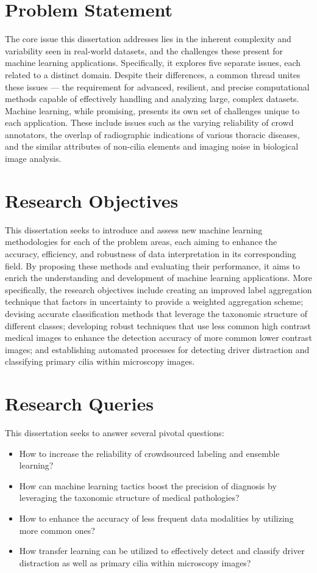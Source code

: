 \section{Problem Statement}
The core issue this dissertation addresses lies in the inherent complexity and variability seen in real-world datasets, and the challenges these present for machine learning applications. Specifically, it explores five separate issues, each related to a distinct domain. Despite their differences, a common thread unites these issues --- the requirement for advanced, resilient, and precise computational methods capable of effectively handling and analyzing large, complex datasets. Machine learning, while promising, presents its own set of challenges unique to each application. These include issues such as the varying reliability of crowd annotators, the overlap of radiographic indications of various thoracic diseases, and the similar attributes of non-cilia elements and imaging noise in biological image analysis.

\section{Research Objectives}
This dissertation seeks to introduce and assess new machine learning methodologies for each of the problem areas, each aiming to enhance the accuracy, efficiency, and robustness of data interpretation in its corresponding field. By proposing these methods and evaluating their performance, it aims to enrich the understanding and development of machine learning applications. More specifically, the research objectives include creating an improved label aggregation technique that factors in uncertainty to provide a weighted aggregation scheme; devising accurate classification methods that leverage the taxonomic structure of different classes; developing robust techniques that use less common high contrast medical images to enhance the detection accuracy of more common lower contrast images; and establishing automated processes for detecting driver distraction and classifying primary cilia within microscopy images.

\section{Research Queries}
This dissertation seeks to answer several pivotal questions:
\begin{itemize}
    \item How to increase the reliability of crowdsourced labeling and ensemble learning?
    \item How can machine learning tactics boost the precision of diagnosis by leveraging the taxonomic structure of medical pathologies?
    \item How to enhance the accuracy of less frequent data modalities by utilizing more common ones?
    \item How transfer learning can be utilized to effectively detect and classify driver distraction as well as primary cilia within microscopy images?
\end{itemize}

